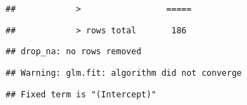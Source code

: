 \documentclass[
]{article}
\begin{document}
\begin{verbatim}
##            >                 =====
\end{verbatim}

\begin{verbatim}
##            > rows total       186
\end{verbatim}

\begin{verbatim}
## drop_na: no rows removed
\end{verbatim}

\begin{verbatim}
## Warning: glm.fit: algorithm did not converge
\end{verbatim}

\begin{verbatim}
## Fixed term is "(Intercept)"
\end{verbatim}
\end{document}
